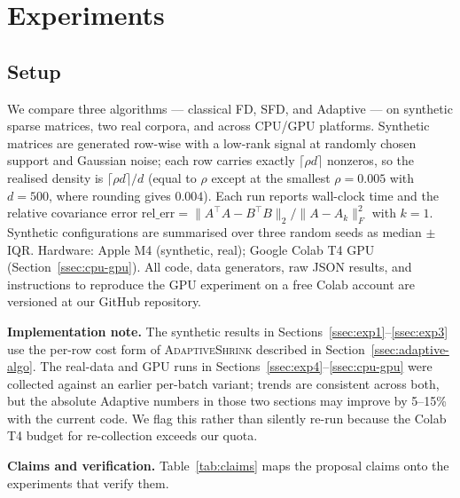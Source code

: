 \documentclass[11pt]{article}
\begin{document}
\section{Experiments}
\label{sec:exp}

\subsection{Setup}

We compare three algorithms --- classical FD, SFD, and Adaptive --- on
synthetic sparse matrices, two real corpora, and across CPU/GPU platforms.
Synthetic matrices are generated row-wise with a low-rank signal at randomly
chosen support and Gaussian noise; each row carries exactly $\lceil \rho d
\rceil$ nonzeros, so the realised density is $\lceil \rho d \rceil / d$
(equal to $\rho$ except at the smallest $\rho = 0.005$ with $d = 500$, where
rounding gives $0.004$). Each run reports wall-clock time and the relative
covariance error $\mathrm{rel\_err} = \|A^\top A - B^\top B\|_2 / \|A -
A_k\|_F^2$ with $k = 1$. Synthetic configurations are summarised over three
random seeds as median $\pm$ IQR. Hardware: Apple M4 (synthetic, real); Google Colab T4 GPU (Section~\ref{ssec:cpu-gpu}).
All code, data generators, raw JSON results, and instructions to reproduce
the GPU experiment on a free Colab account are versioned at our GitHub
repository.

\textbf{Implementation note.} The synthetic results in
Sections~\ref{ssec:exp1}--\ref{ssec:exp3} use the per-row cost form of
\textsc{AdaptiveShrink} described in Section~\ref{ssec:adaptive-algo}. The
real-data and GPU runs in Sections~\ref{ssec:exp4}--\ref{ssec:cpu-gpu} were
collected against an earlier per-batch variant; trends are consistent across
both, but the absolute Adaptive numbers in those two sections may improve by
5--15\% with the current code. We flag this rather than silently re-run
because the Colab T4 budget for re-collection exceeds our quota.

\textbf{Claims and verification.} Table~\ref{tab:claims} maps the proposal
claims onto the experiments that verify them.
\end{document}
